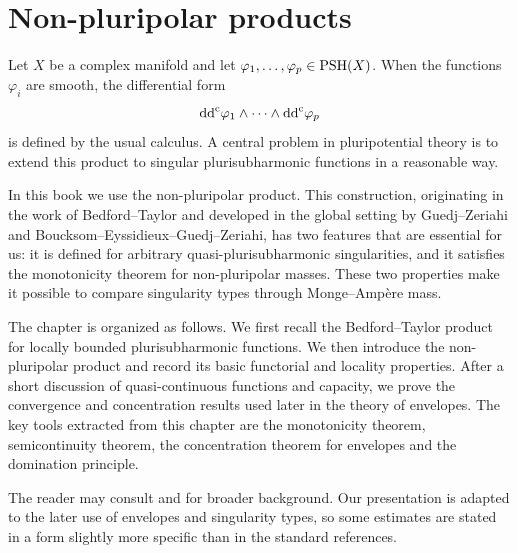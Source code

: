 \chapter{Non-pluripolar products}
\label{chap:npp}

Let $X$ be a complex manifold and let $\varphi_1,\ldots,\varphi_p\in\mathrm{PSH}(X)$. When the functions $\varphi_i$ are smooth, the differential form
\begin{equation}\label{eq:mixedMAtype}
    \mathrm{dd}^{\mathrm{c}}\varphi_1\wedge\cdots\wedge\mathrm{dd}^{\mathrm{c}}\varphi_p
\end{equation}
is defined by the usual calculus. A central problem in pluripotential theory is to extend this product to singular plurisubharmonic functions in a reasonable way.

In this book we use the non-pluripolar product. This construction, originating in the work of Bedford--Taylor and developed in the global setting by Guedj--Zeriahi and Boucksom--Eyssidieux--Guedj--Zeriahi, has two features that are essential for us: it is defined for arbitrary quasi-plurisubharmonic singularities, and it satisfies the monotonicity theorem for non-pluripolar masses. These two properties make it possible to compare singularity types through Monge--Amp\`ere mass.

The chapter is organized as follows. We first recall the Bedford--Taylor product for locally bounded plurisubharmonic functions. We then introduce the non-pluripolar product and record its basic functorial and locality properties. After a short discussion of quasi-continuous functions and capacity, we prove the convergence and concentration results used later in the theory of envelopes. The key tools extracted from this chapter are the monotonicity theorem, semicontinuity theorem, the concentration theorem for envelopes and the domination principle.

The reader may consult \cite{BEGZ10} and \cite{DDNLsurv} for broader background. Our presentation is adapted to the later use of envelopes and singularity types, so some estimates are stated in a form slightly more specific than in the standard references.



